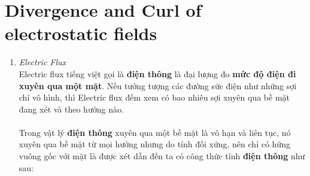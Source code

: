 \section{Divergence and Curl of electrostatic fields}
\begin{enumerate}
    \item \textit{Electric Flux}\\
    Electric flux tiếng việt gọi là \textbf{điện thông} là đại lượng đo \textbf{mức độ điện  đi xuyên qua một mặt}.
Nếu tưởng tượng các đường sức điện như những sợi chỉ vô hình, thì Electric flux đếm xem có bao nhiêu sợi xuyên qua bề mặt đang xét và theo hướng nào.
\\ \\ 
Trong vật lý \textbf{điện thông} xuyên qua một bề mặt là vô hạn và liên tục, nó xuyên qua bề mặt từ mọi hướng nhưng do tính đối xứng, nên chỉ có hứng vuông gốc với mặt là được xét dẫn đến ta có công thức tính \textbf{điện thông} như sau:


\end{enumerate}
